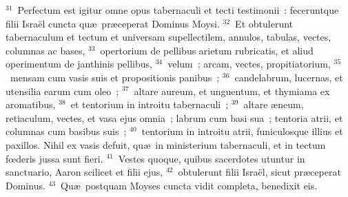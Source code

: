 ${}^{31}$~Perfectum est igitur omne opus tabernaculi et tecti testimonii~: feceruntque filii Isra\"el cuncta qu\ae\ pr\ae ceperat Dominus Moysi.
${}^{32}$~Et obtulerunt tabernaculum et tectum et universam supellectilem, annulos, tabulas, vectes, columnas ac bases,
${}^{33}$~opertorium de pellibus arietum rubricatis, et aliud operimentum de janthinis pellibus,
${}^{34}$~velum~; arcam, vectes, propitiatorium,
${}^{35}$~mensam cum vasis suis et propositionis panibus~;
${}^{36}$~candelabrum, lucernas, et utensilia earum cum oleo~;
${}^{37}$~altare aureum, et unguentum, et thymiama ex aromatibus,
${}^{38}$~et tentorium in introitu tabernaculi~;
${}^{39}$~altare \ae neum, retiaculum, vectes, et vasa ejus omnia~; labrum cum basi sua~; tentoria atrii, et columnas cum basibus suis~;
${}^{40}$~tentorium in introitu atrii, funiculosque illius et paxillos. Nihil ex vasis defuit, qu\ae\ in ministerium tabernaculi, et in tectum fœderis jussa sunt fieri.
${}^{41}$~Vestes quoque, quibus sacerdotes utuntur in sanctuario, Aaron scilicet et filii ejus,
${}^{42}$~obtulerunt filii Isra\"el, sicut pr\ae ceperat Dominus.
${}^{43}$~Qu\ae\ postquam Moyses cuncta vidit completa, benedixit eis.

